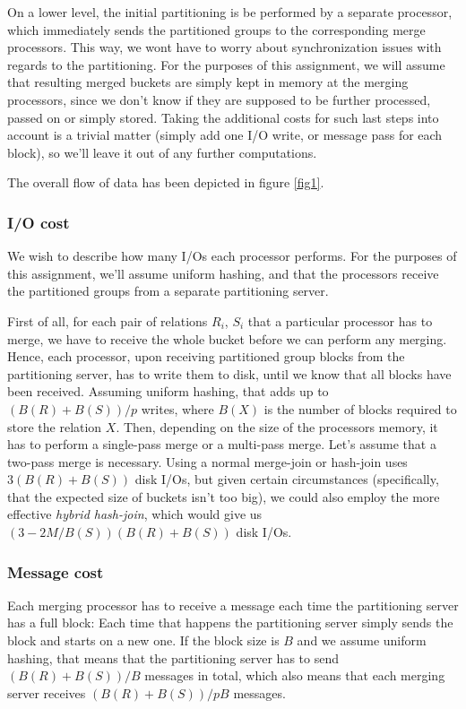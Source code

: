 \documentclass[a4paper, 12pt]{article}
\begin{document}
On a lower level, the initial partitioning is be performed by a
separate processor, which immediately sends the partitioned groups to
the corresponding merge processors. This way, we wont have to worry
about synchronization issues with regards to the partitioning. For the
purposes of this assignment, we will assume that resulting merged
buckets are simply kept in memory at the merging processors, since we
don't know if they are supposed to be further processed, passed on or
simply stored. Taking the additional costs for such last steps into
account is a trivial matter (simply add one I/O write, or message pass
for each block), so we'll leave it out of any further computations.

The overall flow of data has been depicted in figure \ref{fig1}.

\subsubsection*{I/O cost}

We wish to describe how many I/Os each processor performs. For the
purposes of this assignment, we'll assume uniform hashing, and that
the processors receive the partitioned groups from a separate
partitioning server.

First of all, for each pair of relations $R_i$, $S_i$ that a
particular processor has to merge, we have to receive the whole bucket
before we can perform any merging. Hence, each processor, upon
receiving partitioned group blocks from the partitioning server, has
to write them to disk, until we know that all blocks have been
received. Assuming uniform hashing, that adds up to $(B(R) + B(S)) /
p$ writes, where $B(X)$ is the number of blocks required to store the
relation $X$. Then, depending on the size of the processors memory, it
has to perform a single-pass merge or a multi-pass merge. Let's assume
that a two-pass merge is necessary. Using a normal merge-join or
hash-join uses $3(B(R) + B(S))$ disk I/Os, but given certain
circumstances (specifically, that the expected size of buckets isn't
too big), we could also employ the more effective \emph{hybrid
  hash-join}, which would give us $(3 - 2M/ B(S))(B(R) + B(S))$ disk
I/Os.

\subsubsection*{Message cost}

Each merging processor has to receive a message each time the
partitioning server has a full block: Each time that happens the
partitioning server simply sends the block and starts on a new one. If
the block size is $B$ and we assume uniform hashing, that means that
the partitioning server has to send $(B(R) + B(S)) / B$ messages in
total, which also means that each merging server receives $(B(R) +
B(S)) / pB$ messages.
\end{document}
